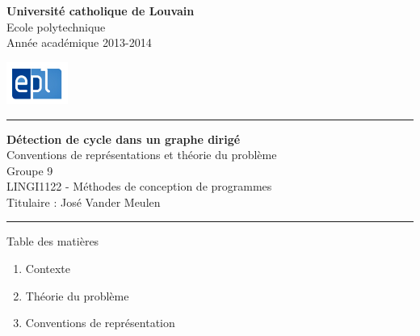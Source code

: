 \begin{minipage}{0.78\linewidth}
\vspace{0.5cm}
\footnotesize\textbf{Université catholique de Louvain}\\
Ecole polytechnique\\
Année académique 2013-2014\\
\end{minipage}
\begin{minipage}{0.1\linewidth}
\begin{flushright}
\includegraphics[width=2cm]{images/logo_EPL.png}
\end{flushright}
\end{minipage}

\vspace{1.5cm}
\par
\hrule height 1.5pt
\par
\vspace{0.5cm}

{\centering
\Large \textbf{Détection de cycle dans un graphe dirigé}\\
\normalsize  Conventions de représentations et théorie du problème\\
\vspace{0.3cm}
\footnotesize Groupe 9\\
LINGI1122 - Méthodes de conception de programmes\\
Titulaire : José Vander Meulen\\}

\vspace{0.5cm}
\par
\hrule height 1.5pt
\par
\vspace{0.5cm}



\begin{frame}{Table des matières}
\begin{enumerate}
  \item Contexte

  \item Théorie du problème
    \item Conventions de représentation
\end{enumerate}
\end{frame}

